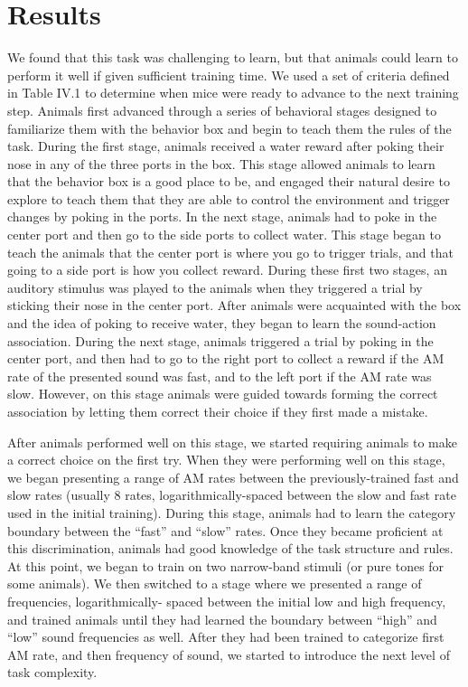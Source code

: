 \section{Results}

We found that this task was challenging to learn, but that animals could learn to perform it well if given sufficient training time.
%
We used a set of criteria defined in Table IV.1 to determine when mice were ready to advance to the next training step.
%
Animals first advanced through a series of behavioral stages designed to familiarize them with the behavior box and begin to teach them the rules of the task.
%
During the first stage, animals received a water reward after poking their nose
in any of the three ports in the box.
%
This stage allowed animals to learn that the behavior box is a good place to
be, and engaged their natural desire to explore to teach them that they are
able to control the environment and trigger changes by poking in the ports.
%
In the next stage, animals had to poke in the center port and then go to the
side ports to collect water.
%
This stage began to teach the animals that the center port is where you go to
trigger trials, and that going to a side port is how you collect reward.
%
During these first two stages, an auditory stimulus was played to the animals when they triggered a trial by sticking their nose in the center port.
%
After animals were acquainted with the box and the idea of poking to receive water, they began to learn the sound-action association.
%
During the next stage, animals triggered a trial by poking in the center port,
and then had to go to the right port to collect a reward if the AM rate of the
presented sound was fast, and to the left port if the AM rate was slow.
%
However, on this stage animals were guided towards forming the correct
association by letting them correct their choice if they first made a mistake.
%

After animals performed well on this stage, we started requiring animals to
make a correct choice on the first try.
%
When they were performing well on this stage, we began presenting a range of AM
rates between the previously-trained fast and slow rates (usually 8 rates,
logarithmically-spaced between the slow and fast rate used in the initial training).
%
During this stage, animals had to learn the category boundary between the
``fast'' and ``slow'' rates.
%
Once they became proficient at this discrimination, animals had good knowledge
of the task structure and rules.
%
At this point, we began to train on two narrow-band stimuli (or pure tones for
some animals).
%
We then switched to a stage where we presented a range of frequencies, logarithmically-
spaced between the initial low and high frequency, and
trained animals until they had learned the boundary between ``high'' and
``low'' sound frequencies as well.
%
After they had been trained to categorize first AM rate, and then frequency of sound,
we started to introduce the next level of task complexity.

